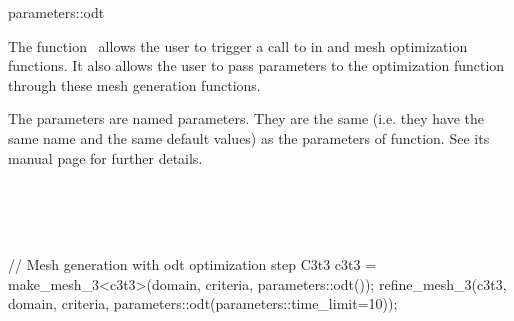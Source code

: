 \ccRefPageBegin


\begin{ccRefFunction}{parameters::odt}  %


\ccDefinition
  
The function \ccRefName\ allows the user to trigger a call to
 in
 and  mesh optimization functions. It also
allows the user to pass parameters to the optimization function 
 through these mesh generation functions.



\ccParameters

The parameters are named parameters. They are the same (i.e. they have the same
name and the same default values) as the parameters of 
function. See its manual page for further details.

\ccSeeAlso

 \\
 \\
 \\


\ccExample

\begin{ccExampleCode}
// Mesh generation with odt optimization step
C3t3 c3t3 = make_mesh_3<c3t3>(domain, criteria, parameters::odt());
refine_mesh_3(c3t3, domain, criteria, parameters::odt(parameters::time_limit=10));
\end{ccExampleCode}


\end{ccRefFunction}

\ccRefPageEnd

